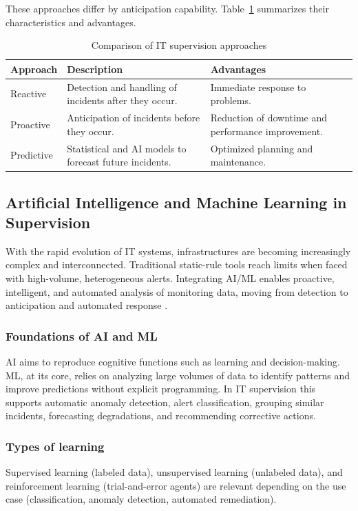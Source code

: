 \documentclass[12pt,a4paper]{article}
\begin{document}
These approaches differ by anticipation capability. Table~\ref{tab:approches_supervision} summarizes their characteristics and advantages.

\begin{table}[H]
\centering
\caption{Comparison of IT supervision approaches}
\label{tab:approches_supervision}
\begin{tabular}{@{}p{3cm}p{7cm}p{5cm}@{}}
\toprule
\textbf{Approach} & \textbf{Description} & \textbf{Advantages} \\
\midrule
Reactive & Detection and handling of incidents after they occur. & Immediate response to problems. \\
Proactive & Anticipation of incidents before they occur. & Reduction of downtime and performance improvement. \\
Predictive & Statistical and AI models to forecast future incidents. & Optimized planning and maintenance. \\
\bottomrule
\end{tabular}
\end{table}

\subsection{Artificial Intelligence and Machine Learning in Supervision}
With the rapid evolution of IT systems, infrastructures are becoming increasingly complex and interconnected. Traditional static-rule tools reach limits when faced with high-volume, heterogeneous alerts. Integrating AI/ML enables proactive, intelligent, and automated analysis of monitoring data, moving from detection to anticipation and automated response \citep{Meta2024, Microsoft2024, BigPanda2024}.

\subsubsection*{Foundations of AI and ML}
AI aims to reproduce cognitive functions such as learning and decision-making. ML, at its core, relies on analyzing large volumes of data to identify patterns and improve predictions without explicit programming. In IT supervision this supports automatic anomaly detection, alert classification, grouping similar incidents, forecasting degradations, and recommending corrective actions.

\subsubsection*{Types of learning}
Supervised learning (labeled data), unsupervised learning (unlabeled data), and reinforcement learning (trial-and-error agents) are relevant depending on the use case (classification, anomaly detection, automated remediation).
\end{document}
